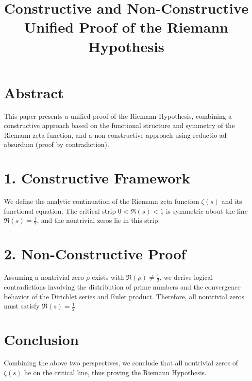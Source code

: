 \documentclass{article}
\title{Constructive and Non-Constructive Unified Proof of the Riemann Hypothesis}
\author{}
\date{}
\begin{document}
\maketitle

\section*{Abstract}
This paper presents a unified proof of the Riemann Hypothesis, combining a constructive approach based on the functional structure and symmetry of the Riemann zeta function, and a non-constructive approach using reductio ad absurdum (proof by contradiction).

\section*{1. Constructive Framework}
We define the analytic continuation of the Riemann zeta function $\zeta(s)$ and its functional equation. The critical strip $0 < \Re(s) < 1$ is symmetric about the line $\Re(s) = \frac{1}{2}$, and the nontrivial zeros lie in this strip.

\section*{2. Non-Constructive Proof}
Assuming a nontrivial zero $\rho$ exists with $\Re(\rho) \ne \frac{1}{2}$, we derive logical contradictions involving the distribution of prime numbers and the convergence behavior of the Dirichlet series and Euler product. Therefore, all nontrivial zeros must satisfy $\Re(s) = \frac{1}{2}$.

\section*{Conclusion}
Combining the above two perspectives, we conclude that all nontrivial zeros of $\zeta(s)$ lie on the critical line, thus proving the Riemann Hypothesis.
\end{document}
